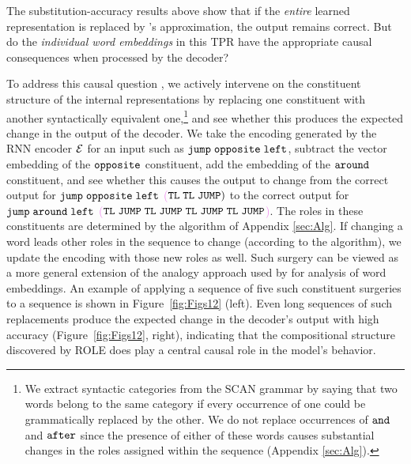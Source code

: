 The substitution-accuracy results above show that if the \textit{entire} learned representation is replaced by \RLN's approximation, the output remains correct. But do the \textit{individual word embeddings} in this TPR have the appropriate causal consequences when processed by the decoder?%

To address this causal question \citep{pearl2000causality}, we actively intervene on the constituent structure of the internal representations by replacing one constituent with another syntactically equivalent
one,\footnote{We extract syntactic categories from the SCAN grammar \citep[Supplementary Fig. 6]{lake2018generalization} by saying that two words belong to the same category if every occurrence of one could be grammatically replaced by the other. We do not replace occurrences of \textcolor{violet}{${\mathtt{and}}$} and \textcolor{violet}{${\mathtt{after}}$} since the presence of either of these words causes substantial changes in the roles assigned within the sequence (Appendix \ref{sec:Alg}).} and see whether this produces the expected change in the output of the decoder.
We take the encoding generated by the RNN encoder ${\mathcal{E}}$ for an input such as \textcolor{violet}{${\mathtt{jump \hspace{1mm} opposite \hspace{1mm} left}}$}, subtract the vector embedding of the \textcolor{violet}{${\mathtt{opposite}}$} constituent, add the embedding of the \textcolor{violet}{${\mathtt{around}}$} constituent, and see whether this causes the output to change from the correct output for \textcolor{violet}{${\mathtt{jump \hspace{1mm} opposite \hspace{1mm} left}}$ (${\mathtt{TL \hspace{1mm} TL \hspace{1mm} JUMP)}}$} to the correct output for \textcolor{violet}{${\mathtt{jump \hspace{1mm} around \hspace{1mm} left}}$ (${\mathtt{TL \hspace{1mm} JUMP \hspace{1mm} TL \hspace{1mm} JUMP \hspace{1mm} TL \hspace{1mm} JUMP \hspace{1mm} TL \hspace{1mm} JUMP}}$)}. The roles in these constituents are determined by the algorithm of Appendix \ref{sec:Alg}. If changing a word leads other roles in the sequence to change (according to the algorithm), we update the encoding with those new roles as well. Such surgery can be viewed as a more general extension of the analogy approach used by \citet{mikolov2013linguistic} for analysis of word embeddings.
An example of applying a sequence of five such constituent surgeries to a sequence is shown in Figure~\ref{fig:Figs12} (left). Even long sequences of such replacements produce the expected change in the decoder's output with high accuracy (Figure~\ref{fig:Figs12}, right), indicating that the compositional structure discovered by ROLE does play a central causal role in the model's behavior.

